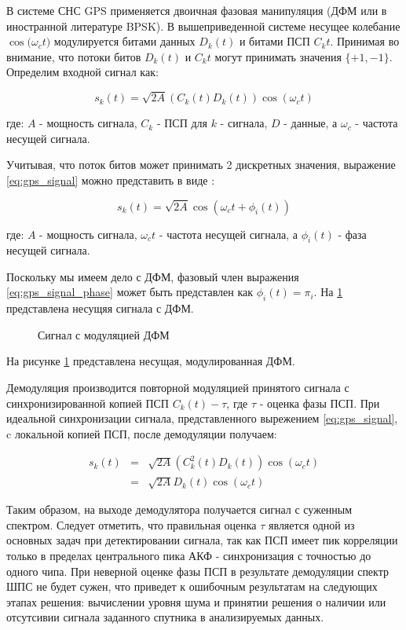 В системе СНС GPS применяется двоичная фазовая манипуляция (ДФМ или в иностранной литературе BPSK).
В вышеприведенной системе несущее колебание ${\cos(\omega_{c}t})$ модулируется битами данных ${D_k(t)}$ и битами ПСП
${C_k{t}}$. Принимая во внимание, что потоки битов ${D_k(t)}$ и ${C_k{t}}$ могут принимать значения
${\{+1, -1\}}$. Определим входной сигнал как:

\begin{center}
\begin{equation}
	\label{eq:gps_signal}
	s_k(t) = \sqrt{2A}(C_k(t)D_k(t))\cos(\omega_{c}t)
\end{equation}
\end{center}
где: ${A}$ - мощность сигнала, ${C_k}$ - ПСП для ${k}$ - сигнала, ${D}$ - данные, а ${\omega_{c}}$ - частота несущей сигнала.

Учитывая, что поток битов может принимать 2 дискретных значения, выражение \ref{eq:gps_signal} можно представить в виде \cite{sklyar}:
\begin{center}
\begin{equation}
	\label{eq:gps_signal_phase}
	s_k(t) = \sqrt{2A}\cos(\omega_{c}t + \phi_{i}(t))
\end{equation}
\end{center}
где: ${A}$ - мощность сигнала, ${\omega_{c}t}$ - частота несущей сигнала, а ${\phi_{i}(t)}$ - фаза несущей сигнала.

Поскольку мы имеем дело с ДФМ, фазовый член выражения \ref{eq:gps_signal_phase} может быть представлен как
${\phi_{i}(t) = \pi_{i}}$. На \ref{pic:sec1_bpsk} представлена несущяя сигнала с ДФМ.

\begin{figure}[ht]
\center{}
\caption{Сигнал с модуляцией ДФМ}
\label{pic:sec1_bpsk}
\end{figure}
На рисунке \ref{pic:sec1_bpsk} представлена несущая, модулированная ДФМ.

Демодуляция производится повторной модуляцией принятого сигнала с синхронизированной копией ПСП ${C_k(t) - \tau}$, где
${\tau}$ - оценка фазы ПСП. При идеальной синхронизации сигнала, представленного вырежением \ref{eq:gps_signal},
c локальной копией ПСП, после демодуляции получаем:
\begin{center}
\begin{eqnarray}
	\label{eq:gps_signal_modulated}
	s_k(t) & = & \sqrt{2A}(C^2_k(t)D_k(t))\cos(\omega_{c}t) \\
	& = &\sqrt{2A}D_k(t)\cos(\omega_{c}t)
\end{eqnarray}
\end{center}
Таким образом, на выходе демодулятора получается сигнал с суженным спектром. Следует отметить, что правильная оценка ${\tau}$
является одной из основных задач при детектировании сигнала, так как ПСП имеет пик корреляции только в пределах центрального пика
АКФ \cite{gold-ieee}  - синхронизация с точностью до одного чипа. При неверной оценке фазы ПСП в результате демодуляции спектр
ШПС не будет сужен, что приведет к ошибочным результатам на следующих этапах решения: вычислении уровня шума и принятии решения
о наличии или отсутсивии сигнала заданного спутника в анализируемых данных.


